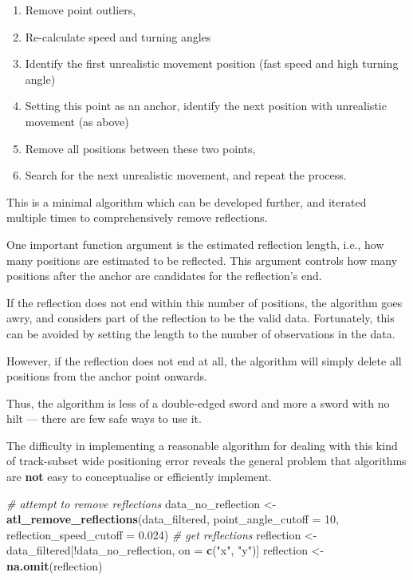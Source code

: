 \documentclass[
]{scrreprt}
\newenvironment{Shaded}{}{}
\newcommand{\CommentTok}[1]{\textcolor[rgb]{0.38,0.63,0.69}{\textit{#1}}}
\newcommand{\DataTypeTok}[1]{\textcolor[rgb]{0.56,0.13,0.00}{#1}}
\newcommand{\DecValTok}[1]{\textcolor[rgb]{0.25,0.63,0.44}{#1}}
\newcommand{\FloatTok}[1]{\textcolor[rgb]{0.25,0.63,0.44}{#1}}
\newcommand{\KeywordTok}[1]{\textcolor[rgb]{0.00,0.44,0.13}{\textbf{#1}}}
\newcommand{\NormalTok}[1]{#1}
\newcommand{\OperatorTok}[1]{\textcolor[rgb]{0.40,0.40,0.40}{#1}}
\newcommand{\StringTok}[1]{\textcolor[rgb]{0.25,0.44,0.63}{#1}}
\begin{document}
\begin{enumerate}
\def\labelenumi{\arabic{enumi}.}
\item
  Remove point outliers,
\item
  Re-calculate speed and turning angles
\item
  Identify the first unrealistic movement position (fast speed and high turning angle)
\item
  Setting this point as an anchor, identify the next position with unrealistic movement (as above)
\item
  Remove all positions between these two points,
\item
  Search for the next unrealistic movement, and repeat the process.
\end{enumerate}

This is a minimal algorithm which can be developed further, and iterated multiple times to comprehensively remove reflections.

One important function argument is the estimated reflection length, i.e., how many positions are estimated to be reflected. This argument controls how many positions after the anchor are candidates for the reflection's end.

If the reflection does not end within this number of positions, the algorithm goes awry, and considers part of the reflection to be the valid data.
Fortunately, this can be avoided by setting the length to the number of observations in the data.

However, if the reflection does not end at all, the algorithm will simply delete all positions from the anchor point onwards.

Thus, the algorithm is less of a double-edged sword and more a sword with no hilt --- there are few safe ways to use it.

The difficulty in implementing a reasonable algorithm for dealing with this kind of track-subset wide positioning error reveals the general problem that algorithms are \textbf{not} easy to conceptualise or efficiently implement.

\begin{Shaded}
\begin{Highlighting}[]
\CommentTok{\# attempt to remove reflections}
\NormalTok{data\_no\_reflection <{-}}\StringTok{ }\KeywordTok{atl\_remove\_reflections}\NormalTok{(data\_filtered,}
                          \DataTypeTok{point\_angle\_cutoff =} \DecValTok{10}\NormalTok{,}
                          \DataTypeTok{reflection\_speed\_cutoff =} \FloatTok{0.024}\NormalTok{)}
\CommentTok{\# get reflections}
\NormalTok{reflection <{-}}\StringTok{ }\NormalTok{data\_filtered[}\OperatorTok{!}\NormalTok{data\_no\_reflection,}
\NormalTok{                                         on =}\StringTok{ }\KeywordTok{c}\NormalTok{(}\StringTok{"x"}\NormalTok{, }\StringTok{"y"}\NormalTok{)]}
\NormalTok{reflection <{-}}\StringTok{ }\KeywordTok{na.omit}\NormalTok{(reflection)}
\end{Highlighting}
\end{Shaded}
\end{document}
